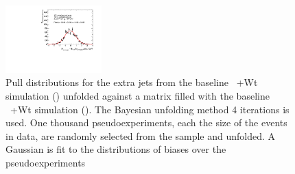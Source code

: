 \begin{figure}
\includegraphics[width=0.33\textwidth]{fig/UnfoldPull/SingleSlicePull40.pdf}
%
\caption{Pull distributions for the extra jets from the baseline \ttbar\ +Wt simulation (\powpy) unfolded against a matrix filled with the baseline \ttbar\ +Wt simulation (\powpy). The Bayesian unfolding method 4 iterations is used. One thousand pseudoexperiments, each the size of the events in data, are randomly selected from the sample and unfolded.  A Gaussian is fit to the distributions of biases over the pseudoexperiments}
\label{fig:appPull2}
\end{figure}
\clearpage
